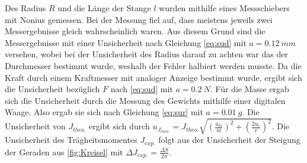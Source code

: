 Des Radius $R$ und die Länge der Stange $l$ wurden mithilfe eines Messschiebers mit Nonius gemessen. Bei der Messung fiel auf, dass meistens jeweils  zwei Messergebnisse gleich wahrscheinlich  waren. Aus diesem Grund sind die Messergebnisse mit einer Unsicherheit nach Gleichung \ref{eq:sud} mit $a=\SI{0,12}{mm}$ versehen, wobei bei der Unsicherheit des Radius darauf zu achten war das der Durchmesser bestimmt wurde, weshalb der Fehler halbiert werden musste. Da die Kraft durch einem Kraftmesser mit analoger Anzeige bestimmt wurde, ergibt sich die Unsicherheit bezüglich $F$ nach \ref{eq:sud} mit $a=\SI{0,2}{N}$. Für die Masse  ergab sich die Unsicherheit durch die Messung des Gewichts mithilfe einer digitalen Waage. Also ergab sie sich nach Gleichung \ref{eq:sur} mit $a=\SI{0,01}{g}$. 
Die Unsicherheit von $J_{theo.}$ ergibt sich durch $u_{J_{theo.}}=J_{theo.}\sqrt{\left(\frac{u_m}{m}\right)^2+\left(\frac{2u_r}{r}\right)^2}$.
Die Unsicherheit des Trägheitsmomentes $J_{exp.}$ folgt aus der Unsicherheit der Steigung der Geraden aus \cref{fig:Kreisel} mit $\Delta J_{exp.}=\frac{\Delta S}{2  \pi}$.

